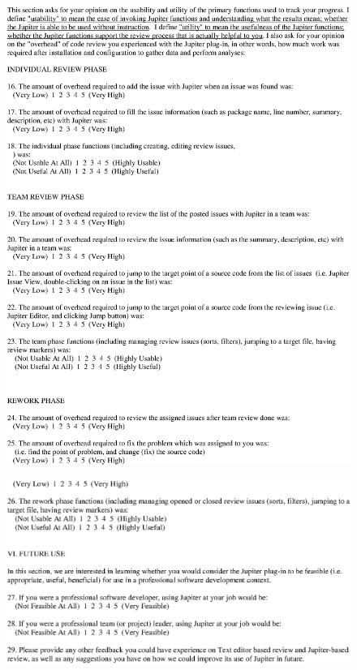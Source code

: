 \begin{figure}[htbp]
  \centering
  \includegraphics{images/appndx-4-5.eps}
  \label{appndx-4-5}
\end{figure}

\begin{figure}[htbp]
  \centering
  \includegraphics{images/appndx-4-6.eps}
  \label{appndx-4-6}
\end{figure}
